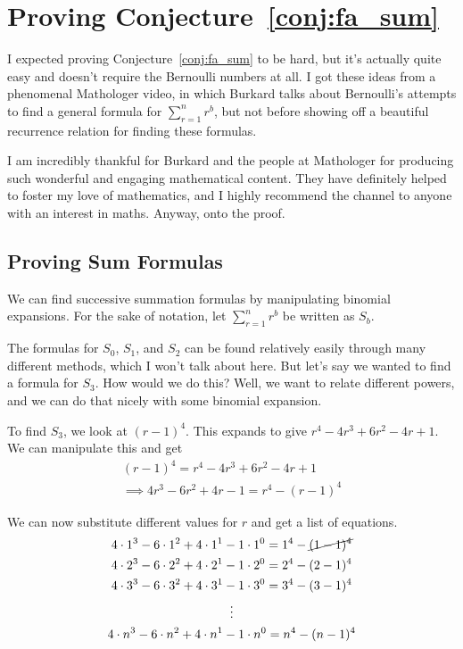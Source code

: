 \documentclass[a4paper]{article}
\newcommand{\sn}{\sum\limits_{r=1}^{n}}
\begin{document}
\section{Proving Conjecture~\ref{conj:fa_sum}}

I expected proving Conjecture~\ref{conj:fa_sum} to be hard, but it's actually quite easy and doesn't require the Bernoulli numbers at all. I got these ideas from a phenomenal Mathologer video\cite{mathologer-power-sums}, in which Burkard talks about Bernoulli's attempts to find a general formula for $\sn r^b$, but not before showing off a beautiful recurrence relation for finding these formulas.

I am incredibly thankful for Burkard and the people at Mathologer for producing such wonderful and engaging mathematical content. They have definitely helped to foster my love of mathematics, and I highly recommend the channel to anyone with an interest in maths. Anyway, onto the proof.

\subsection{Proving Sum Formulas}

We can find successive summation formulas by manipulating binomial expansions. For the sake of notation, let $\sn r^b$ be written as $S_b$.

The formulas for $S_0$, $S_1$, and $S_2$ can be found relatively easily through many different methods, which I won't talk about here. But let's say we wanted to find a formula for $S_3$. How would we do this? Well, we want to relate different powers, and we can do that nicely with some binomial expansion.

To find $S_3$, we look at $(r-1)^4$. This expands to give $r^4 - 4r^3 + 6r^2 - 4r + 1$. We can manipulate this and get
\begin{gather*}
(r-1)^4 = r^4 - 4r^3 + 6r^2 - 4r + 1\\[0.5em]
\implies 4r^3 - 6r^2 + 4r - 1 = r^4 - (r-1)^4
\end{gather*}

We can now substitute different values for $r$ and get a list of equations.
\begin{gather*}
4 \cdot 1^3 - 6 \cdot 1^2 + 4 \cdot 1^1 - 1 \cdot 1^0 = 1^4 - \cancel{(1-1)^4}\\
4 \cdot 2^3 - 6 \cdot 2^2 + 4 \cdot 2^1 - 1 \cdot 2^0 = 2^4 - (2-1)^4\\
4 \cdot 3^3 - 6 \cdot 3^2 + 4 \cdot 3^1 - 1 \cdot 3^0 = 3^4 - (3-1)^4\\
\vdots\\
4 \cdot n^3 - 6 \cdot n^2 + 4 \cdot n^1 - 1 \cdot n^0 = n^4 - (n-1)^4
\end{gather*}
\end{document}
